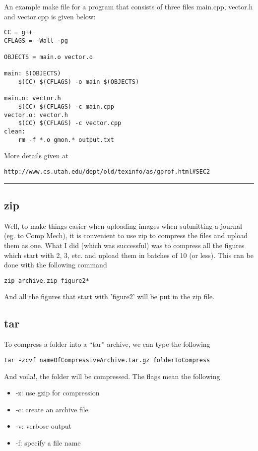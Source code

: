 \documentclass[a4paper, 10pt]{article}
\newcommand{\mybotrule}{\vspace{4mm}\hrule}
\begin{document}
An example make file for a program that consists of three files main.cpp, vector.h and vector.cpp is given below:

\begin{verbatim}
CC = g++
CFLAGS = -Wall -pg

OBJECTS = main.o vector.o

main: $(OBJECTS)
	$(CC) $(CFLAGS) -o main $(OBJECTS)

main.o: vector.h
	$(CC) $(CFLAGS) -c main.cpp
vector.o: vector.h
	$(CC) $(CFLAGS) -c vector.cpp
clean:
	rm -f *.o gmon.* output.txt
\end{verbatim}

More details given at 
\begin{verbatim}
http://www.cs.utah.edu/dept/old/texinfo/as/gprof.html#SEC2
\end{verbatim}
\mybotrule

\subsection*{zip}

Well, to make things easier when uploading images when submitting a journal (eg. to Comp Mech), it is convenient to use zip to compress the files and upload them as one. What I did (which was successful) was to compress all the figures which start with 2, 3, etc. and upload them in batches of 10 (or less). This can be done with the following command
\begin{verbatim}
zip archive.zip figure2*
\end{verbatim}
And all the figures that start with 'figure2' will be put in the zip file. 

\subsection*{tar}

To compress a folder into a ``tar'' archive, we can type the following
\begin{verbatim}
tar -zcvf nameOfCompressiveArchive.tar.gz folderToCompress
\end{verbatim}
And voila!, the folder will be compressed. The flags mean the following
\begin{itemize}
\item -z: use gzip for compression
\item -c: create an archive file
\item -v: verbose output
\item -f: specify a file name
\end{itemize}
\end{document}
